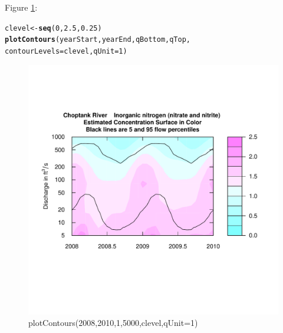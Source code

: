 \documentclass[a4paper,11pt]{article}\usepackage{graphicx, color}
\makeatletter
\newcommand{\hlfunctioncall}[1]{\textcolor[rgb]{0.501960784313725,0,0.329411764705882}{\textbf{#1}}}%
\newenvironment{kframe}{%
 \def\at@end@of@kframe{}%
 \ifinner\ifhmode%
  \def\at@end@of@kframe{\end{minipage}}%
  \begin{minipage}{\columnwidth}%
 \fi\fi%
 \def\FrameCommand##1{\hskip\@totalleftmargin \hskip-\fboxsep
 \colorbox{shadecolor}{##1}\hskip-\fboxsep
     \hskip-\linewidth \hskip-\@totalleftmargin \hskip\columnwidth}%
 \MakeFramed {\advance\hsize-\width
   \@totalleftmargin\z@ \linewidth\hsize
   \@setminipage}}%
 {\par\unskip\endMakeFramed%
 \at@end@of@kframe}
\newenvironment{knitrout}{}{} %
\makeatother
\begin{document}
Figure \ref{fig:plotContours}:
\begin{knitrout}
\color{fgcolor}\begin{kframe}
\begin{alltt}
clevel<-\hlfunctioncall{seq}(0,2.5,0.25)
\hlfunctioncall{plotContours}(yearStart,yearEnd,qBottom,qTop, 
             contourLevels = clevel,qUnit=1)
\end{alltt}
\end{kframe}\begin{figure}[]

\includegraphics[width=1\linewidth,height=1\linewidth]{figure/plotContours} \caption[plotContours(2008,2010,1,5000,clevel,qUnit=1)]{plotContours(2008,2010,1,5000,clevel,qUnit=1)\label{fig:plotContours}}
\end{figure}


\end{knitrout}
\end{document}
